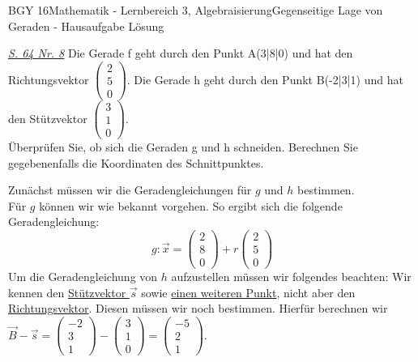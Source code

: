 \documentclass[oneside,openany,headings=optiontotoc,11pt,numbers=noenddot]{scrreprt}
\begin{document}
\begin{worksheet}{BGY 16}{Mathematik - Lernbereich 3, Algebraisierung}{Gegenseitige Lage von Geraden - Hausaufgabe Lösung}
		\begin{framed}
			\noindent
			\underline{\textit{S. 64 Nr. 8}} Die Gerade f geht durch den Punkt A(3|8|0) und hat den Richtungsvektor \(\left(\begin{array}{c}2\\5\\0\end{array}\right)\). Die Gerade h geht durch den Punkt B(-2|3|1) und hat den Stützvektor \(\left(\begin{array}{c}3\\1\\0\end{array}\right)\).\\
			Überprüfen Sie, ob sich die Geraden g und h schneiden. Berechnen Sie gegebenenfalls die Koordinaten des Schnittpunktes.\\
			\par\noindent
			Zunächst müssen wir die Geradengleichungen für \(g\) und \(h\) bestimmen.\\
			Für \(g\) können wir wie bekannt vorgehen. So ergibt sich die folgende Geradengleichung:
			\[g: \vec{x} = \left(\begin{array}{c}2\\8\\0\end{array}\right) + r\left(\begin{array}{c}2\\5\\0\end{array}\right)\]
			Um die Geradengleichung von \(h\) aufzustellen müssen wir folgendes beachten: Wir kennen den \color{codegreen}\underline{Stützvektor \(\vec{s}\)}\normalcolor{} sowie \color{codegreen}\underline{einen weiteren Punkt}\normalcolor, nicht aber den \color{red}\underline{Richtungsvektor}\normalcolor. Diesen müssen wir noch bestimmen. \tiny{\color{codegray}Hierfür berechnen wir \(\vec{B} - \vec{s} = \left(\begin{array}{c}-2\\3\\1\end{array}\right) - \left(\begin{array}{c}3\\1\\0\end{array}\right) = \left(\begin{array}{c}-5\\2\\1\end{array}\right)\).}

\end{framed}
\end{worksheet}
\end{document}
